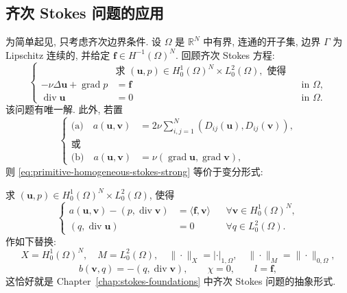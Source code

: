 \subsection{齐次 Stokes 问题的应用}\label{subsec:primitive-homogeneous-stokes}

为简单起见, 只考虑齐次边界条件. 设 $\Omega$ 是 $\mathbb R^N$ 中有界,
连通的开子集, 边界 $\Gamma$ 为 Lipschitz 连续的, 并给定
$\mathbf f\in H^{-1}(\Omega)^N$. 回顾齐次 Stokes 方程:
\begin{equation}\label{eq:primitive-homogeneous-stokes-strong}
\left\{
\begin{aligned}
&\text{求 }(\mathbf u,p)\in H_0^1(\Omega)^N\times L_0^2(\Omega),\text{ 使得}\\
-\nu\Delta\mathbf u+\operatorname{grad}p&=\mathbf f
&&\text{in }\Omega,\\
\operatorname{div}\mathbf u&=0
&&\text{in }\Omega.
\end{aligned}
\right.
\end{equation}
该问题有唯一解. 此外, 若置
\begin{equation}\label{eq:primitive-stokes-bilinear-forms}
\left\{
\begin{aligned}
\text{(a)}\quad a(\mathbf u,\mathbf v)
&=2\nu\sum_{i,j=1}^N(D_{ij}(\mathbf u),D_{ij}(\mathbf v)),\\
\text{或}\qquad\\[-1.4em]
\text{(b)}\quad a(\mathbf u,\mathbf v)
&=\nu(\operatorname{grad}\mathbf u,\operatorname{grad}\mathbf v),
\end{aligned}
\right.
\end{equation}
则 \eqref{eq:primitive-homogeneous-stokes-strong} 等价于变分形式:

求 $(\mathbf u,p)\in H_0^1(\Omega)^N\times L_0^2(\Omega)$, 使得
\begin{equation}\label{eq:primitive-homogeneous-stokes-weak}
\left\{
\begin{aligned}
a(\mathbf u,\mathbf v)-(p,\operatorname{div}\mathbf v)
&=\langle\mathbf f,\mathbf v\rangle
&&\forall\mathbf v\in H_0^1(\Omega)^N,\\
(q,\operatorname{div}\mathbf u)&=0
&&\forall q\in L_0^2(\Omega).
\end{aligned}
\right.
\end{equation}
作如下替换:
\[
X=H_0^1(\Omega)^N,
\quad M=L_0^2(\Omega),
\quad\|\cdot\|_X=|\cdot|_{1,\Omega},
\quad\|\cdot\|_M=\|\cdot\|_{0,\Omega},
\]
\[
b(\mathbf v,q)=-(q,\operatorname{div}\mathbf v),
\qquad
\chi=0,
\qquad
l=\mathbf f,
\]
这恰好就是 Chapter~\ref{chap:stokes-foundations} 中齐次 Stokes 问题的抽象形式.

